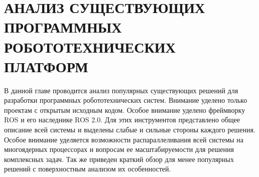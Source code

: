 \chapter{АНАЛИЗ СУЩЕСТВУЮЩИХ ПРОГРАММНЫХ РОБОТОТЕХНИЧЕСКИХ ПЛАТФОРМ}

В данной главе проводится анализ популярных существующих решений для разработки программных робототехнических систем. Внимание уделено только проектам с открытым исходным кодом. Особое внимание уделено фреймворку ROS и его наследнике ROS 2.0. Для этих инструментов представлено общее описание всей системы и выделены слабые и сильные стороны каждого решения. Особое внимание уделяется возможности распараллеливания всей системы на многоядерных процессорах и вопросам ее масштабируемости для решения комплексных задач. Так же приведен краткий обзор для менее популярных решений с поверхностным анализом их особенностей.










